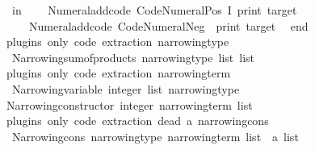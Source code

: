 \begin{isabellebody}
\ \ in\isanewline
\ \ \ \ Numeral{\isachardot}{\kern0pt}add{\isacharunderscore}{\kern0pt}code\ \isactrlconstUNDERSCOREname {\isasymopen}Code{\isacharunderscore}{\kern0pt}Numeral{\isachardot}{\kern0pt}Pos{\isasymclose}\ I\ print\ target\isanewline
\ \ \ \ {\isacharhash}{\kern0pt}{\isachargreater}{\kern0pt}\ Numeral{\isachardot}{\kern0pt}add{\isacharunderscore}{\kern0pt}code\ \isactrlconstUNDERSCOREname {\isasymopen}Code{\isacharunderscore}{\kern0pt}Numeral{\isachardot}{\kern0pt}Neg{\isasymclose}\ {\isacharparenleft}{\kern0pt}{\isachartilde}{\kern0pt}{\isacharparenright}{\kern0pt}\ print\ target\isanewline
\ \ end\isanewline
{\isacartoucheclose}%
\endisatagML
{\isafoldML}%
%
\isadelimML
%
\endisadelimML
%
\isadelimdocument
%
\endisadelimdocument
%
\isatagdocument
%
\isamarkuptrue%
%
\endisatagdocument
{\isafolddocument}%
%
\isadelimdocument
%
\endisadelimdocument
{}\isamarkupfalse%
\ {\isacharparenleft}{\kern0pt}plugins\ only{\isacharcolon}{\kern0pt}\ code\ extraction{\isacharparenright}{\kern0pt}\ narrowing{\isacharunderscore}{\kern0pt}type\ {\isacharequal}{\kern0pt}\isanewline
\ \ Narrowing{\isacharunderscore}{\kern0pt}sum{\isacharunderscore}{\kern0pt}of{\isacharunderscore}{\kern0pt}products\ {\isachardoublequoteopen}narrowing{\isacharunderscore}{\kern0pt}type\ list\ list{\isachardoublequoteclose}\isanewline
\isanewline
{}\isamarkupfalse%
\ {\isacharparenleft}{\kern0pt}plugins\ only{\isacharcolon}{\kern0pt}\ code\ extraction{\isacharparenright}{\kern0pt}\ narrowing{\isacharunderscore}{\kern0pt}term\ {\isacharequal}{\kern0pt}\isanewline
\ \ Narrowing{\isacharunderscore}{\kern0pt}variable\ {\isachardoublequoteopen}integer\ list{\isachardoublequoteclose}\ narrowing{\isacharunderscore}{\kern0pt}type\isanewline
{\isacharbar}{\kern0pt}\ Narrowing{\isacharunderscore}{\kern0pt}constructor\ integer\ {\isachardoublequoteopen}narrowing{\isacharunderscore}{\kern0pt}term\ list{\isachardoublequoteclose}\isanewline
\isanewline
{}\isamarkupfalse%
\ {\isacharparenleft}{\kern0pt}plugins\ only{\isacharcolon}{\kern0pt}\ code\ extraction{\isacharparenright}{\kern0pt}\ {\isacharparenleft}{\kern0pt}dead\ {\isacharprime}{\kern0pt}a{\isacharparenright}{\kern0pt}\ narrowing{\isacharunderscore}{\kern0pt}cons\ {\isacharequal}{\kern0pt}\isanewline
\ \ Narrowing{\isacharunderscore}{\kern0pt}cons\ narrowing{\isacharunderscore}{\kern0pt}type\ {\isachardoublequoteopen}{\isacharparenleft}{\kern0pt}narrowing{\isacharunderscore}{\kern0pt}term\ list\ {\isasymRightarrow}\ {\isacharprime}{\kern0pt}a{\isacharparenright}{\kern0pt}\ list{\isachardoublequoteclose}\isanewline

\end{isabellebody}
